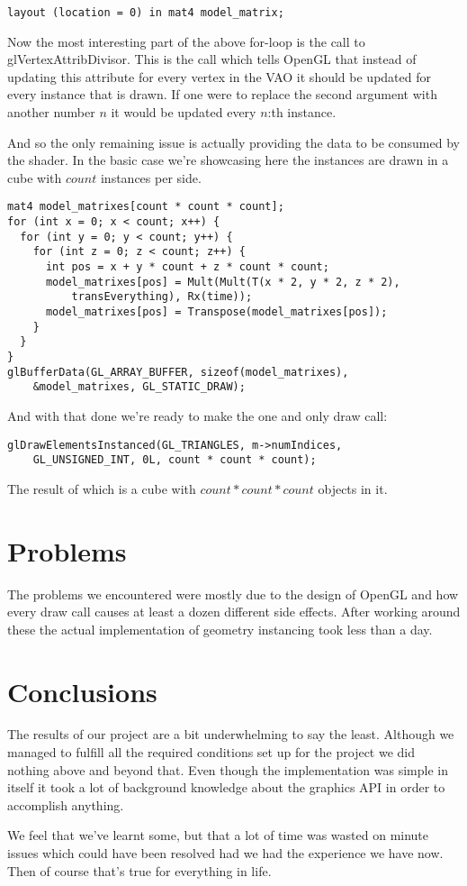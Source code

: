 \documentclass[a4paper,12pt]{article}
\begin{document}
\begin{lstlisting}
layout (location = 0) in mat4 model_matrix;
\end{lstlisting}

Now the most interesting part of the above for-loop is the call to glVertexAttribDivisor. This is the call which tells OpenGL that instead of updating this attribute for every vertex in the VAO it should be updated for every instance that is drawn. If one were to replace the second argument with another number $n$ it would be updated every $n$:th instance.

And so the only remaining issue is actually providing the data to be consumed by the shader. In the basic case we're showcasing here the instances are drawn in a cube with $count$ instances per side.

\begin{lstlisting}
mat4 model_matrixes[count * count * count];
for (int x = 0; x < count; x++) {
  for (int y = 0; y < count; y++) {
    for (int z = 0; z < count; z++) {
      int pos = x + y * count + z * count * count;
      model_matrixes[pos] = Mult(Mult(T(x * 2, y * 2, z * 2),
          transEverything), Rx(time));
      model_matrixes[pos] = Transpose(model_matrixes[pos]);
    }
  }
}
glBufferData(GL_ARRAY_BUFFER, sizeof(model_matrixes),
    &model_matrixes, GL_STATIC_DRAW);
\end{lstlisting}
\noindent
And with that done we're ready to make the one and only draw call:

\begin{lstlisting}
glDrawElementsInstanced(GL_TRIANGLES, m->numIndices,
    GL_UNSIGNED_INT, 0L, count * count * count);
\end{lstlisting}
\noindent
The result of which is a cube with $count * count * count$ objects in it.

\section{Problems}

The problems we encountered were mostly due to the design of OpenGL and how every draw call causes at least a dozen different side effects. After working around these the actual implementation of geometry instancing took less than a day.

\section{Conclusions}

The results of our project are a bit underwhelming to say the least. Although we managed to fulfill all the required conditions set up for the project we did nothing above and beyond that. Even though the implementation was simple in itself it took a lot of background knowledge about the graphics API in order to accomplish anything.

We feel that we've learnt some, but that a lot of time was wasted on minute issues which could have been resolved had we had the experience we have now. Then of course that's true for everything in life.
\end{document}
